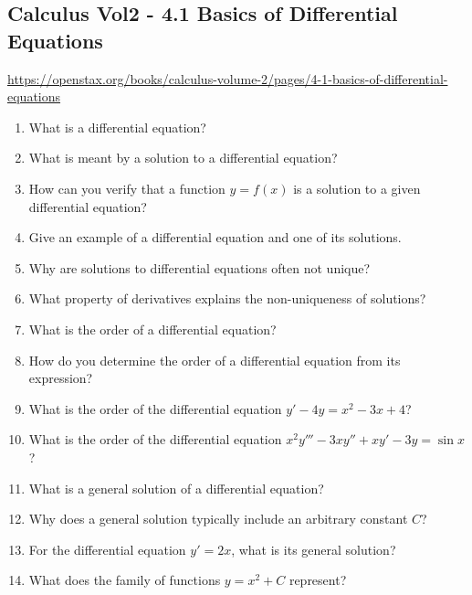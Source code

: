 \subsection{Calculus Vol2 - 4.1 Basics of Differential Equations}

\url{https://openstax.org/books/calculus-volume-2/pages/4-1-basics-of-differential-equations}

\begin{enumerate}

\item What is a differential equation?

\item What is meant by a solution to a differential equation?

\item How can you verify that a function $y=f(x)$ is a solution to a given differential equation?

\item Give an example of a differential equation and one of its solutions.

\item Why are solutions to differential equations often not unique?

\item What property of derivatives explains the non-uniqueness of solutions?

\item What is the order of a differential equation?

\item How do you determine the order of a differential equation from its expression?

\item What is the order of the differential equation $y' - 4y = x^2 - 3x + 4$?

\item What is the order of the differential equation $x^2 y''' - 3x y'' + x y' - 3y = \sin x$?

\item What is a general solution of a differential equation?

\item Why does a general solution typically include an arbitrary constant $C$?

\item For the differential equation $y' = 2x$, what is its general solution?

\item What does the family of functions $y = x^2 + C$ represent?


\end{enumerate}
